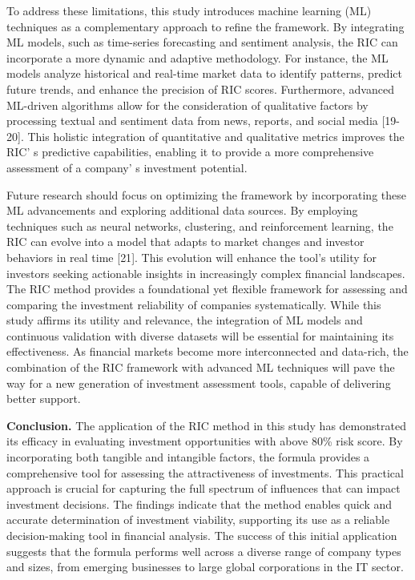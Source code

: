 {To address these limitations, this study introduces machine learning
(ML) techniques as a complementary approach to refine the framework. By
integrating ML models, such as time-series forecasting and sentiment
analysis, the RIC can incorporate a more dynamic and adaptive
methodology. For instance, the ML models analyze historical and
real-time market data to identify patterns, predict future trends, and
enhance the precision of RIC scores. Furthermore, advanced ML-driven
algorithms allow for the consideration of qualitative factors by
processing textual and sentiment data from news, reports, and social
media {[}19-20{]}. This holistic integration of quantitative and
qualitative metrics improves the RIC' s predictive
capabilities, enabling it to provide a more comprehensive assessment of
a company' s investment potential.

Future research should focus on optimizing the framework by
incorporating these ML advancements and exploring additional data
sources. By employing techniques such as neural networks, clustering,
and reinforcement learning, the RIC can evolve into a model that adapts
to market changes and investor behaviors in real time {[}21{]}. This
evolution will enhance the tool's utility for investors seeking
actionable insights in increasingly complex financial landscapes. The
RIC method provides a foundational yet flexible framework for assessing
and comparing the investment reliability of companies systematically.
While this study affirms its utility and relevance, the integration of
ML models and continuous validation with diverse datasets will be
essential for maintaining its effectiveness. As financial markets become
more interconnected and data-rich, the combination of the RIC framework
with advanced ML techniques will pave the way for a new generation of
investment assessment tools, capable of delivering better support.

{\bfseries Conclusion.} The application of the RIC method in this study has
demonstrated its efficacy in evaluating investment opportunities with
above 80\% risk score. By incorporating both tangible and intangible
factors, the formula provides a comprehensive tool for assessing the
attractiveness of investments. This practical approach is crucial for
capturing the full spectrum of influences that can impact investment
decisions. The findings indicate that the method enables quick and
accurate determination of investment viability, supporting its use as a
reliable decision-making tool in financial analysis. The success of this
initial application suggests that the formula performs well across a
diverse range of company types and sizes, from emerging businesses to
large global corporations in the IT sector.

}
